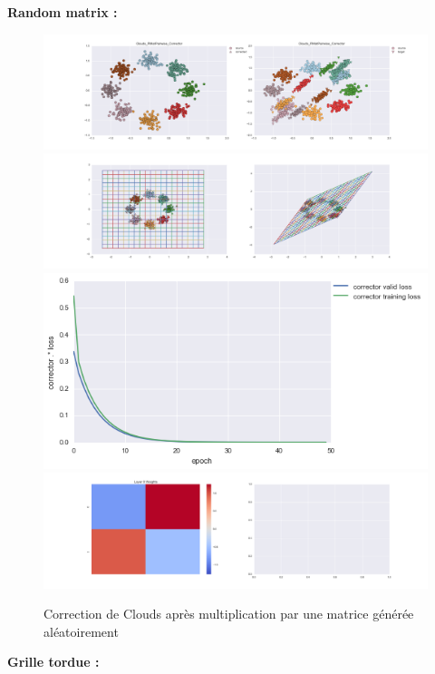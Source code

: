 {\Large \textbf{Random matrix :}}

\begin{figure}[H] %
\centering
\includegraphics[width=\linewidth]{fig/24-05-2016/clouds/Clouds_RMatPairwise_Corrector-DATA.png}
\includegraphics[width=\linewidth]{fig/24-05-2016/clouds/Clouds_RMatPairwise_Corrector-GridCheck.png}
\includegraphics[width=0.45\linewidth]{fig/24-05-2016/clouds/Clouds_RMatPairwise_Corrector-Learning_curve.png}
\includegraphics[width=\linewidth]{fig/24-05-2016/clouds/Clouds_RMatPairwise_Corrector-W.png}
\caption{Correction de Clouds après multiplication par une matrice générée aléatoirement}
\label{fig:recap-clouds-RMat-pairwise}
\end{figure}


{\Large \textbf{Grille tordue :}}

